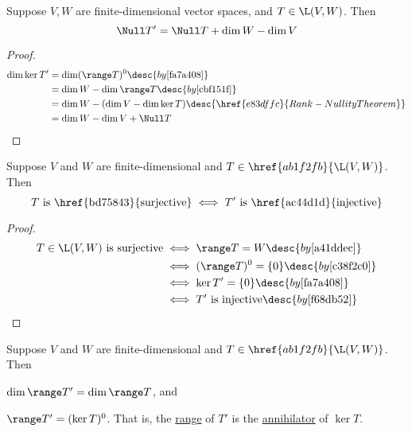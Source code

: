Suppose $V,W$ are finite-dimensional vector spaces, and $T\in\L(V,W)$. Then
$$
  \Null T'=\Null T+\dim W-\dim V
$$

\begin{proof}
  \begin{align*}
    \dim\ker T' &=\dim (\range T)^0\desc{by \autoref{fa7a408}}                          \\
                &=\dim W-\dim\range T\desc{by \autoref{cbf151f}}                        \\
                &=\dim W-(\dim V-\dim\ker T)\desc{\href{e83dffc}{Rank-Nullity Theorem}} \\
                &=\dim W-\dim V+\Null T
  \end{align*}
\end{proof}

\label{dc4d419}

Suppose $V$ and $W$ are finite-dimensional and $T\in\href{ab1f2fb}{\L(V,W)}$.
Then
$$
  T\text{ is \href{bd75843}{surjective}}\iff T'\text{ is \href{ac44d1d}{injective}}
$$

\begin{proof}
  \begin{align*}
    T\in\L(V,W)\text{ is surjective} &\iff\range T=W\desc{by \autoref{a41ddec}}              \\
                                     &\iff(\range T)^0=\{0\}\desc{by \autoref{c38f2c0}}      \\
                                     &\iff\ker T'=\{0\}\desc{by \autoref{fa7a408}}           \\
                                     &\iff T'\text{ is injective}\desc{by \autoref{f68db52}}
  \end{align*}
\end{proof}

\label{f24806d}

Suppose $V$ and $W$ are finite-dimensional and $T\in\href{ab1f2fb}{\L(V,W)}$.
Then
\begin{enumerata}
  \item $\dim\range T'=\dim\range T$, and
  \item $\range T'=(\ker T)^0$. That is, the \href{a3ef003}{range} of $T'$ is
  the \href{af14470}{annihilator} of $\ker T$.
\end{enumerata}

